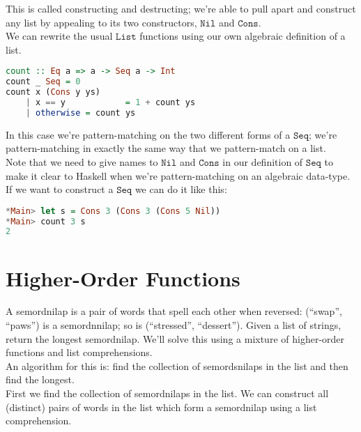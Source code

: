 \documentclass[a4paper,12pt]{article}
\newcommand{\kwa}[1]{\mathtt{#1}}
\begin{document}
\noindent
This is called constructing and destructing; we're able to pull apart and construct any list by appealing to its two constructors, $\kwa{Nil}$ and $\kwa{Cons}$.\\

\noindent
We can rewrite the usual $\kwa{List}$ functions using our own algebraic definition of a list.

\begin{lstlisting}[language=Haskell]
count :: Eq a => a -> Seq a -> Int
count _ Seq = 0
count x (Cons y ys)
	| x == y			= 1 + count ys
	| otherwise	= count ys 
\end{lstlisting}

\noindent
In this case we're pattern-matching on the two different forms of a $\kwa{Seq}$; we're pattern-matching in exactly the same way that we pattern-match on a list. \\

\noindent
Note that we need to give names to $\kwa{Nil}$ and $\kwa{Cons}$ in our definition of $\kwa{Seq}$ to make it clear to Haskell when we're pattern-matching on an algebraic data-type. \\

\noindent
If we want to construct a $\kwa{Seq}$ we can do it like this: 

\begin{lstlisting}[language=Haskell]
*Main> let s = Cons 3 (Cons 3 (Cons 5 Nil))
*Main> count 3 s
2
\end{lstlisting}

\section{Higher-Order Functions}

\noindent
A semordnilap is a pair of words that spell each other when reversed: (``swap'', ``paws'') is a semordnnilap; so is (``stressed'', ``dessert'').  Given a list of strings, return the longest semordnilap. We'll solve this using a mixture of higher-order functions and list comprehensions.\\

\noindent
An algorithm for this is: find the collection of semordsnilaps in the list and then find the longest. \\

\noindent
First we find the collection of semordnilaps in the list. We can construct all (distinct) pairs of words in the list which form a semordnilap using a list comprehension.
\end{document}
